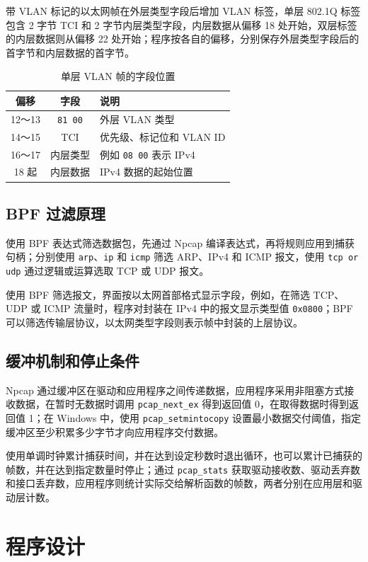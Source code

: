\documentclass[UTF8,a4paper,11pt,scheme=chinese]{ctexart}
\newcommand{\code}[1]{\texttt{#1}}
\newcommand{\enhex}[1]{\texttt{#1}}
\begin{document}
带 VLAN 标记的以太网帧在外层类型字段后增加 VLAN 标签，单层 802.1Q 标签包含 2 字节 TCI 和 2 字节内层类型字段，内层数据从偏移 18 处开始，双层标签的内层数据则从偏移 22 处开始；程序按各自的偏移，分别保存外层类型字段后的首字节和内层数据的首字节。
\begin{table}[H]\centering\small
\begin{tabularx}{\linewidth}{c c X}\toprule
偏移&字段&说明\\\midrule
12～13&\enhex{81 00}&外层 VLAN 类型\\
14～15&TCI&优先级、标记位和 VLAN ID\\
16～17&内层类型&例如 \enhex{08 00} 表示 IPv4\\
18 起&内层数据&IPv4 数据的起始位置\\\bottomrule
\end{tabularx}
\caption{单层 VLAN 帧的字段位置}\end{table}

\subsection{BPF 过滤原理}
使用 BPF 表达式筛选数据包，先通过 Npcap 编译表达式，再将规则应用到捕获句柄；分别使用 \code{arp}、\code{ip} 和 \code{icmp} 筛选 ARP、IPv4 和 ICMP 报文，使用 \code{tcp or udp} 通过逻辑或运算选取 TCP 或 UDP 报文。

使用 BPF 筛选报文，界面按以太网首部格式显示字段，例如，在筛选 TCP、UDP 或 ICMP 流量时，程序对封装在 IPv4 中的报文显示类型值 \enhex{0x0800}；BPF 可以筛选传输层协议，以太网类型字段则表示帧中封装的上层协议。

\subsection{缓冲机制和停止条件}
Npcap 通过缓冲区在驱动和应用程序之间传递数据，应用程序采用非阻塞方式接收数据，在暂时无数据时调用 \code{pcap\_next\_ex} 得到返回值 0，在取得数据时得到返回值 1；在 Windows 中，使用 \code{pcap\_setmintocopy} 设置最小数据交付阈值，指定缓冲区至少积累多少字节才向应用程序交付数据。

使用单调时钟累计捕获时间，并在达到设定秒数时退出循环，也可以累计已捕获的帧数，并在达到指定数量时停止；通过 \code{pcap\_stats} 获取驱动接收数、驱动丢弃数和接口丢弃数，应用程序则统计实际交给解析函数的帧数，两者分别在应用层和驱动层计数。

\section{程序设计}
\end{document}
